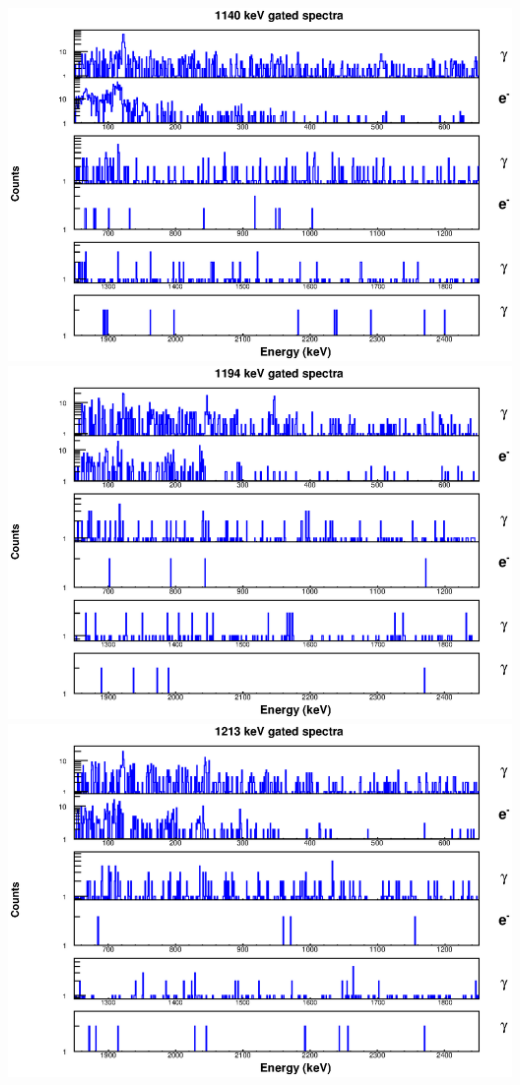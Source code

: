 \includegraphics[scale=0.8]{154Gd_Appendix/1140_combined.eps}
\includegraphics[scale=0.8]{154Gd_Appendix/1194_combined.eps}
\includegraphics[scale=0.8]{154Gd_Appendix/1213_combined.eps}
